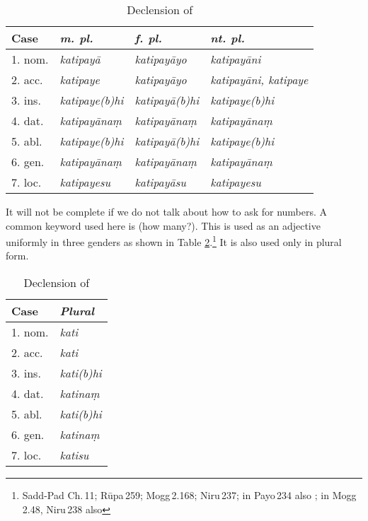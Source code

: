 \begin{table}[!hbt]
\centering
\caption{Declension of }
\label{tab:katipaya}
\bigskip
\begin{tabular}{@{}l*{3}{>{\itshape}l}@{}} \toprule
\bfseries Case & \bfseries\upshape m. pl. & \bfseries\upshape f. pl. & \bfseries\upshape nt. pl. \\
\midrule
1. nom. & katipay\=a & katipay\=ayo & katipay\=ani \\
2. acc. & katipaye & katipay\=ayo & katipay\=ani, katipaye \\
3. ins. & katipaye(b)hi & katipay\=a(b)hi & katipaye(b)hi \\
4. dat. & katipay\=ana\d m & katipay\=ana\d m & katipay\=ana\d m \\
5. abl. & katipaye(b)hi & katipay\=a(b)hi & katipaye(b)hi \\
6. gen. & katipay\=ana\d m & katipay\=ana\d m & katipay\=ana\d m \\
7. loc. & katipayesu & katipay\=asu & katipayesu \\
\bottomrule
\end{tabular}
\end{table}

It will not be complete if we do not talk about how to ask for numbers. A common keyword used here is  (how many?). This is used as an adjective uniformly in three genders as shown in Table \ref{tab:kati}.\footnote{Sadd-Pad Ch.\,11; R\=upa\,259; Mogg\,2.168; Niru\,237; in Payo\,234 also ; in Mogg\,2.48, Niru\,238 also } It is also used only in plural form.

\begin{table}[!hbt]
\centering
\caption{Declension of }
\label{tab:kati}
\bigskip
\begin{tabular}{@{}l>{\itshape}l@{}} \toprule
\bfseries Case & \bfseries\upshape Plural \\ 
\midrule
1. nom. & kati \\
2. acc. & kati \\
3. ins. & kati(b)hi \\
4. dat. & katina\d m \\
5. abl. & kati(b)hi \\
6. gen. & katina\d m \\ 
7. loc. & katisu \\
\bottomrule
\end{tabular}
\end{table}

